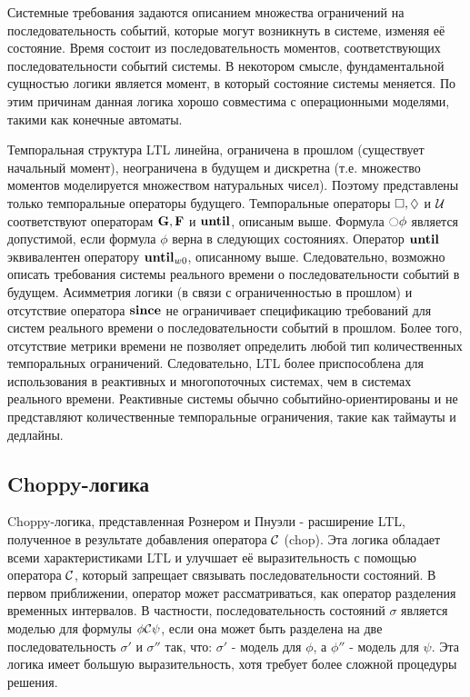 			Системные требования задаются описанием множества ограничений на последовательность событий, которые могут возникнуть в системе, изменяя её состояние.
			Время состоит из последовательность моментов, соответствующих последовательности событий системы.
			В некотором смысле, фундаментальной сущностью логики является момент, в который состояние системы меняется.
			По этим причинам данная логика хорошо совместима с операционными моделями, такими как конечные автоматы.
			
			Темпоральная структура LTL линейна, ограничена в прошлом (существует начальный момент), неограничена в будущем и дискретна (т.е. множество моментов моделируется множеством натуральных чисел). 
			Поэтому представлены только темпоральные операторы будущего. 
			Темпоральные операторы $ \square, \lozenge $ и $ \mathcal{U} $ соответствуют операторам $ \textbf{G}, \textbf{F} $ и $ \text{\textbf{until}} $, описаным выше. 
			Формула $ \Next \phi $ является допустимой, если формула $ \phi $ верна в следующих состояниях. 
			Оператор $ \text{\textbf{until}} $ эквивалентен оператору $ \text{\textbf{until}}_{w0} $, описанному выше. Следовательно, возможно описать требования системы реального времени о последовательности событий в будущем. 
			Асимметрия логики (в связи с ограниченностью в прошлом) и отсутствие оператора $ \text{\textbf{since}} $ не ограничивает спецификацию требований для систем реального времени о последовательности событий в прошлом. 
			Более того, отсутствие метрики времени не позволяет определить любой тип количественных темпоральных ограничений. 
			Следовательно, LTL более приспособлена для использования в реактивных и многопоточных системах, чем в системах реального времени. 
			Реактивные системы обычно событийно-ориентированы и не представляют количественные темпоральные ограничения, такие как таймауты и дедлайны.
			
			
		\subsection{Choppy-логика}
			Choppy-логика, представленная Рознером и Пнуэли \cite{Rosner} - расширение LTL, полученное в результате добавления оператора $ \mathcal{C} $ (chop).
			Эта логика обладает всеми характеристиками LTL и улучшает её выразительность с помощью оператора $ \mathcal{C} $, который запрещает связывать последовательности состояний.
			В первом приближении, оператор может рассматриваться, как оператор разделения временных интервалов.
			В частности, последовательность состояний $ \sigma $ является моделью для формулы $ \phi\mathcal{C}\psi $, если она может быть разделена на две последовательность $ \sigma' $ и $ \sigma'' $ так, что: $ \sigma' $ - модель для $ \phi $, а $ \phi'' $ - модель для $ \psi $.
			Эта логика имеет большую выразительность, хотя требует более сложной процедуры решения.
		
